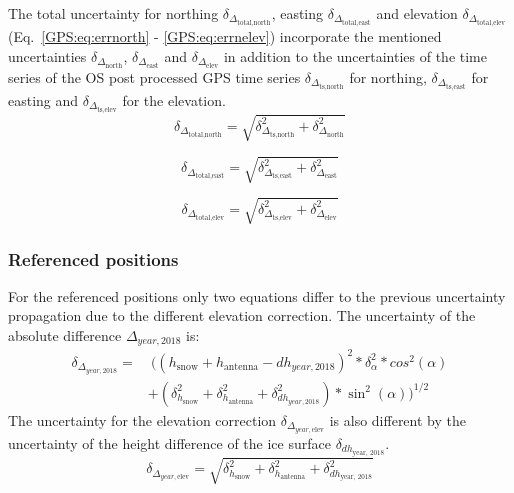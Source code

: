 The total uncertainty for northing $\delta_{\Delta_{\text{total,north}}}$, easting $\delta_{\Delta_{\text{total,east}}}$ and elevation $\delta_{\Delta_{\text{total,elev}}}$ (Eq.~\ref{GPS:eq:errnorth} - \ref{GPS:eq:errnelev}) incorporate the mentioned uncertainties $\delta_{\Delta_{\text{north}}}$, $\delta_{\Delta_{\text{east}}}$ and $\delta_{\Delta_{\text{elev}}}$ in addition to the uncertainties of the time series of the OS post processed GPS time series $\delta_{\Delta_{\text{ts,north}}}$ for northing, $\delta_{\Delta_{\text{ts,east}}}$ for easting and $\delta_{\Delta_{\text{ts,elev}}}$ for the elevation.
\begin{equation}
	\delta_{\Delta_{\text{total,north}}} = \sqrt{\delta_{\Delta_{\text{ts,north}}}^2 + \delta_{\Delta_{\text{north}}}^2}
	\label{GPS:eq:errnorth}
\end{equation}

\begin{equation}
	\delta_{\Delta_{\text{total,east}}} = \sqrt{\delta_{\Delta_{\text{ts,east}}}^2 + \delta_{\Delta_{\text{east}}}^2}
	\label{GPS:eq:erreast}
\end{equation}

\begin{equation}
	\delta_{\Delta_{\text{total,elev}}} = \sqrt{\delta_{\Delta_{\text{ts,elev}}}^2 +\delta_{\Delta_{\text{elev}}}^2}
	\label{GPS:eq:errnelev}
\end{equation}

\subsubsection*{Referenced positions}

For the referenced positions only two equations differ to the previous uncertainty propagation due to the different elevation correction. 
The uncertainty of the absolute difference $\Delta_{year,2018}$ is:
\begin{equation}
\begin{split}
\delta_{\Delta_{year,2018}} = & 
\ ((h_{\text{snow}} + h_{\text{antenna}} - dh_{year,2018})^2 * \delta_{\alpha}^2 * cos^2(\alpha)\\
&+ (\delta_{h_{\text{snow}}}^2 + \delta_{h_{\text{antenna}}}^2 + \delta_{dh_{year,2018}}^2) * \sin^2(\alpha))^{1/2}
\end{split}
\end{equation}
The uncertainty for the elevation correction $\delta_{\Delta_{year, \text{elev}}}$ is also different by the uncertainty of the height difference of the ice surface $\delta_{dh_{\text{year, 2018}}}$.
\begin{equation}
	\delta_{\Delta_{year, \text{elev}}} = \sqrt{\delta_{h_{\text{snow}}}^2 + \delta_{h_{\text{antenna}}}^2 + \delta_{dh_{\text{year, 2018}}}^2}
\end{equation}


